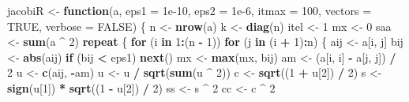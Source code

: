 \documentclass[12pt,]{article}
\newenvironment{Shaded}{\begin{snugshade}}{\end{snugshade}}
\newcommand{\KeywordTok}[1]{\textcolor[rgb]{0.13,0.29,0.53}{\textbf{#1}}}
\newcommand{\DataTypeTok}[1]{\textcolor[rgb]{0.13,0.29,0.53}{#1}}
\newcommand{\DecValTok}[1]{\textcolor[rgb]{0.00,0.00,0.81}{#1}}
\newcommand{\FloatTok}[1]{\textcolor[rgb]{0.00,0.00,0.81}{#1}}
\newcommand{\StringTok}[1]{\textcolor[rgb]{0.31,0.60,0.02}{#1}}
\newcommand{\OtherTok}[1]{\textcolor[rgb]{0.56,0.35,0.01}{#1}}
\newcommand{\ControlFlowTok}[1]{\textcolor[rgb]{0.13,0.29,0.53}{\textbf{#1}}}
\newcommand{\OperatorTok}[1]{\textcolor[rgb]{0.81,0.36,0.00}{\textbf{#1}}}
\newcommand{\NormalTok}[1]{#1}
\begin{document}
\begin{Shaded}
\begin{Highlighting}[]
\NormalTok{jacobiR <-}
\StringTok{  }\ControlFlowTok{function}\NormalTok{(a,}
           \DataTypeTok{eps1 =} \FloatTok{1e-10}\NormalTok{,}
           \DataTypeTok{eps2 =} \FloatTok{1e-6}\NormalTok{,}
           \DataTypeTok{itmax =} \DecValTok{100}\NormalTok{,}
           \DataTypeTok{vectors =} \OtherTok{TRUE}\NormalTok{,}
           \DataTypeTok{verbose =} \OtherTok{FALSE}\NormalTok{) \{}
\NormalTok{    n <-}\StringTok{ }\KeywordTok{nrow}\NormalTok{(a)}
\NormalTok{    k <-}\StringTok{ }\KeywordTok{diag}\NormalTok{(n)}
\NormalTok{    itel <-}\StringTok{ }\DecValTok{1}
\NormalTok{    mx <-}\StringTok{ }\DecValTok{0}
\NormalTok{    saa <-}\StringTok{ }\KeywordTok{sum}\NormalTok{(a }\OperatorTok{^}\StringTok{ }\DecValTok{2}\NormalTok{)}
    \ControlFlowTok{repeat}\NormalTok{ \{}
      \ControlFlowTok{for}\NormalTok{ (i }\ControlFlowTok{in} \DecValTok{1}\OperatorTok{:}\NormalTok{(n }\OperatorTok{-}\StringTok{ }\DecValTok{1}\NormalTok{))}
        \ControlFlowTok{for}\NormalTok{ (j }\ControlFlowTok{in}\NormalTok{ (i }\OperatorTok{+}\StringTok{ }\DecValTok{1}\NormalTok{)}\OperatorTok{:}\NormalTok{n) \{}
\NormalTok{          aij <-}\StringTok{ }\NormalTok{a[i, j]}
\NormalTok{          bij <-}\StringTok{ }\KeywordTok{abs}\NormalTok{(aij)}
          \ControlFlowTok{if}\NormalTok{ (bij }\OperatorTok{<}\StringTok{ }\NormalTok{eps1)}
            \ControlFlowTok{next}\NormalTok{()}
\NormalTok{          mx <-}\StringTok{ }\KeywordTok{max}\NormalTok{(mx, bij)}
\NormalTok{          am <-}\StringTok{ }\NormalTok{(a[i, i] }\OperatorTok{-}\StringTok{ }\NormalTok{a[j, j]) }\OperatorTok{/}\StringTok{ }\DecValTok{2}
\NormalTok{          u <-}\StringTok{ }\KeywordTok{c}\NormalTok{(aij, }\OperatorTok{-}\NormalTok{am)}
\NormalTok{          u <-}\StringTok{ }\NormalTok{u }\OperatorTok{/}\StringTok{ }\KeywordTok{sqrt}\NormalTok{(}\KeywordTok{sum}\NormalTok{(u }\OperatorTok{^}\StringTok{ }\DecValTok{2}\NormalTok{))}
\NormalTok{          c <-}\StringTok{ }\KeywordTok{sqrt}\NormalTok{((}\DecValTok{1} \OperatorTok{+}\StringTok{ }\NormalTok{u[}\DecValTok{2}\NormalTok{]) }\OperatorTok{/}\StringTok{ }\DecValTok{2}\NormalTok{)}
\NormalTok{          s <-}\StringTok{ }\KeywordTok{sign}\NormalTok{(u[}\DecValTok{1}\NormalTok{]) }\OperatorTok{*}\StringTok{ }\KeywordTok{sqrt}\NormalTok{((}\DecValTok{1} \OperatorTok{-}\StringTok{ }\NormalTok{u[}\DecValTok{2}\NormalTok{]) }\OperatorTok{/}\StringTok{ }\DecValTok{2}\NormalTok{)}
\NormalTok{          ss <-}\StringTok{ }\NormalTok{s }\OperatorTok{^}\StringTok{ }\DecValTok{2}
\NormalTok{          cc <-}\StringTok{ }\NormalTok{c }\OperatorTok{^}\StringTok{ }\DecValTok{2}

\end{Highlighting}
\end{Shaded}
\end{document}
